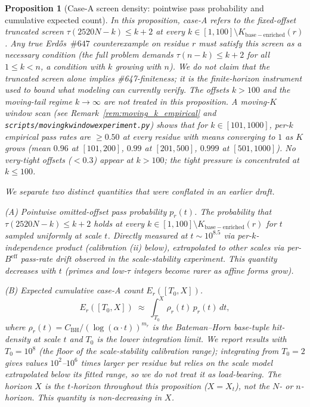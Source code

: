 \documentclass[11pt]{article}
\renewcommand{\_}{\origunderscore\allowbreak}
\newtheorem{proposition}[theorem]{Proposition}
\theoremstyle{definition}
\theoremstyle{remark}
\begin{document}
\begin{proposition}[Case-A screen density: pointwise pass probability and cumulative expected count]\label{prop:case_a_density}
In this proposition, \emph{case-A} refers to the fixed-offset
truncated screen $\tau(2520N - k) \le k+2$ at every
$k\in[1,100]\setminus K_{\mathrm{base-enriched}}(r)$.  Any true
Erd\H{o}s~$\#647$ counterexample on residue $r$ must satisfy this
screen as a \emph{necessary} condition (the full problem demands
$\tau(n-k)\le k+2$ for all $1\le k<n$, a condition with $k$ growing
with $n$).  We do \emph{not} claim that the truncated screen alone
implies \#647-finiteness; it is the finite-horizon instrument used to
bound what modeling can currently verify.  The offsets $k>100$ and
the moving-tail regime $k\to\infty$ are not treated in this
proposition.  A moving-$K$ window scan (see
Remark~\ref{rem:moving_k_empirical} and
\texttt{scripts/moving\_k\_window\_experiment.py}) shows that for
$k\in[101, 1000]$, per-$k$ empirical pass rates are $\ge 0.50$ at
every residue with means converging to $1$ as $K$ grows (mean
$0.96$ at $[101, 200]$, $0.99$ at $[201, 500]$, $0.999$ at
$[501, 1000]$).  No very-tight offsets ($<0.3$) appear at $k>100$;
the tight pressure is concentrated at $k\le 100$.

We separate two distinct quantities that were conflated in an earlier
draft.

\emph{(A) Pointwise omitted-offset pass probability $p_r(t)$.}  The
probability that $\tau(2520N - k)\le k+2$ holds at every
$k\in[1,100]\setminus K_{\mathrm{base-enriched}}(r)$ for $t$ sampled
uniformly at scale $t$.  Directly measured at $t\sim 10^{8.5}$ via
per-$k$-independence product (calibration (ii) below), extrapolated to
other scales via per-$B^{\mathrm{eff}}$ pass-rate drift observed in
the scale-stability experiment.  This quantity \emph{decreases} with $t$
(primes and low-$\tau$ integers become rarer as affine forms grow).

\emph{(B) Expected cumulative case-A count $E_r([T_0, X])$.}
\[
  E_r([T_0, X]) \;\approx\; \int_{T_0}^X \rho_r(t)\, p_r(t)\,dt,
\]
where $\rho_r(t) = C_{\mathrm{BH}}/(\log(\alpha\cdot t))^{m_r}$ is the
Bateman--Horn base-tuple hit-density at scale $t$ and $T_0$ is the
lower integration limit.  We report results with $T_0 = 10^8$ (the
floor of the scale-stability calibration range); integrating from
$T_0 = 2$ gives values $10^2$--$10^6$ times larger per residue but
relies on the scale model extrapolated below its fitted range, so we
do not treat it as load-bearing.  The horizon $X$ is the $t$-horizon
throughout this proposition ($X = X_t$), not the $N$- or $n$-horizon.
This quantity is non-decreasing in $X$.


\end{proposition}
\end{document}
